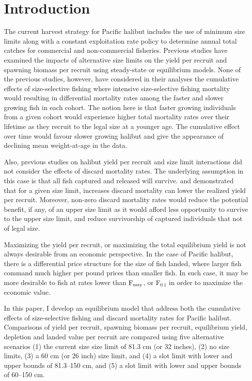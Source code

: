 \section*{Introduction} %
\label{sec:introduction}

The current harvest strategy for Pacific halibut includes the use of minimum size limits along with a constant exploitation rate policy to determine annual total catches for commercial and non-commercial fisheries.  Previous studies have examined the impacts of alternative size limits on the yield per recruit and spawning biomass per recruit using steady-state or equilibrium models.  None of the previous studies, however, have considered in their analyses the cumulative effects of size-selective fishing where intensive size-selective fishing mortality would resulting in differential mortality rates among the faster and slower growing fish in each cohort.  The notion here is that faster growing individuals from a given cohort would experience higher total mortality rates over their lifetime as they recruit to the legal size at a younger age. The cumulative effect over time would favour slower growing halibut and give the appearance of declining mean weight-at-age in the data.

Also, previous studies on halibut yield per recruit and size limit interactions did not consider the effects of discard mortality rates. The underlying assumption in this case is that all fish captured and released will survive. \cite{coggins2007ecm} and \cite{pineiii2008car} demonstrated that for a given size limit, increases discard mortality can lower the realized yield per recruit. Moreover, non-zero discard mortality rates would reduce the potential benefit, if any, of an upper size limit as it would afford less opportunity to survive to the upper size limit, and reduce survivorship of captured individuals that not of legal size.

Maximizing the yield per recruit, or maximizing the total equilibrium yield is not always desirable from an economic perspective.  In the case of Pacific halibut, there is a differential price structure for the size of fish landed, where larger fish command much higher per pound prices than smaller fish. In such case, it may be more desirable to fish at rates lower than $\rm{F_{msy}}$, or F$_{0.1}$ in order to maximize the economic value.

In this paper, I develop an equilibrium model that address both the cumulative effects of size-selective fishing and discard mortality rates for Pacific halibut.  Comparisons of yield per recruit, spawning biomass per recruit, equilibrium yield, depletion and landed value per recruit are compared using five alternative scenarios (1) the current size size limit of 81.3 cm (or 32 inches), (2) no size limits, (3) a 60 cm (or 26 inch) size limit, and (4) a slot limit with lower and upper bounds of 81.3--150 cm, and (5) a slot limit with lower and upper bounds of 60--150 cm.

